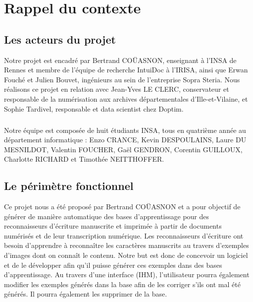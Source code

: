 
\chapter{Rappel du contexte}

\section{Les acteurs du projet}

Notre projet est encadré par Bertrand COÜASNON, enseignant à l’INSA de Rennes et membre de l’équipe de recherche IntuiDoc à l’IRISA, ainsi que Erwan Fouché et Julien Bouvet, ingénieurs au sein de l’entreprise Sopra Steria. Nous réalisons ce projet en relation avec Jean-Yves LE CLERC, conservateur et responsable de la numérisation  aux archives départementales d’Ille-et-Vilaine, et Sophie Tardivel, responsable et data scientist chez Doptim.

\paragraph{}

Notre équipe est composée de huit étudiants INSA, tous en quatrième année au département informatique : Enzo CRANCE, Kevin DESPOULAINS, Laure DU MESNILDOT, Valentin FOUCHER, Gaël GENDRON, Corentin GUILLOUX, Charlotte RICHARD et Timothée NEITTHOFFER.

\section{Le périmètre fonctionnel}

Ce projet nous a été proposé par Bertrand COÜASNON et a pour objectif de générer de manière automatique des bases d’apprentissage pour des reconnaisseurs d’écriture manuscrite et imprimée à partir de documents numérisés et de leur transcription numérique. Les reconnaisseurs d’écriture ont besoin d’apprendre à reconnaître les caractères manuscrits au travers d'exemples d'images dont on connaît le contenu. Notre but est donc de concevoir un logiciel et de le développer afin qu’il puisse générer ces exemples dans des bases d’apprentissage. Au travers d’une interface (IHM), l’utilisateur pourra également modifier les exemples générés dans la base afin de les corriger s’ils ont mal été générés. Il pourra également les supprimer de la base.

\paragraph{}

